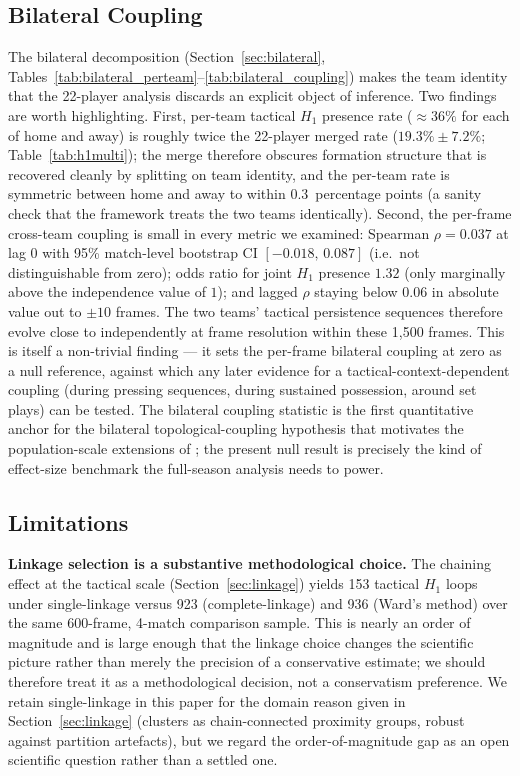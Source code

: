 \subsection{Bilateral Coupling}
\label{sec:bilateral_discussion}

The bilateral decomposition (Section~\ref{sec:bilateral}, Tables~\ref{tab:bilateral_perteam}--\ref{tab:bilateral_coupling}) makes the team identity that the 22-player analysis discards an explicit object of inference. Two findings are worth highlighting. First, per-team tactical \(H_1\) presence rate (\(\approx 36\%\) for each of home and away) is roughly twice the 22-player merged rate (\(19.3\%\pm 7.2\%\); Table~\ref{tab:h1multi}); the merge therefore obscures formation structure that is recovered cleanly by splitting on team identity, and the per-team rate is symmetric between home and away to within 0.3~percentage points (a sanity check that the framework treats the two teams identically). Second, the per-frame cross-team coupling is small in every metric we examined: Spearman \(\rho=0.037\) at lag 0 with 95\% match-level bootstrap CI \([-0.018,\,0.087]\) (i.e.\ not distinguishable from zero); odds ratio for joint \(H_1\) presence \(1.32\) (only marginally above the independence value of \(1\)); and lagged \(\rho\) staying below \(0.06\) in absolute value out to \(\pm 10\) frames. The two teams' tactical persistence sequences therefore evolve close to independently at frame resolution within these 1{,}500 frames. This is itself a non-trivial finding --- it sets the per-frame bilateral coupling at zero as a null reference, against which any later evidence for a tactical-context-dependent coupling (during pressing sequences, during sustained possession, around set plays) can be tested. The bilateral coupling statistic is the first quantitative anchor for the bilateral topological-coupling hypothesis that motivates the population-scale extensions of \citet{Brown2026inprep}; the present null result is precisely the kind of effect-size benchmark the full-season analysis needs to power.

\subsection{Limitations}
\label{sec:limitations}

\textbf{Linkage selection is a substantive methodological choice.} The chaining effect at the tactical scale (Section~\ref{sec:linkage}) yields 153 tactical \(H_1\) loops under single-linkage versus 923 (complete-linkage) and 936 (Ward's method) over the same 600-frame, 4-match comparison sample. This is nearly an order of magnitude and is large enough that the linkage choice changes the scientific picture rather than merely the precision of a conservative estimate; we should therefore treat it as a methodological decision, not a conservatism preference. We retain single-linkage in this paper for the domain reason given in Section~\ref{sec:linkage} (clusters as chain-connected proximity groups, robust against partition artefacts), but we regard the order-of-magnitude gap as an open scientific question rather than a settled one.

